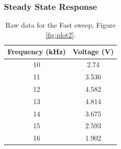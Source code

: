 \documentclass{article}
\begin{document}
\subsubsection{Steady State Response}
\begin{table}[H]
    \centering
    \begin{tabular}{c|c}
        Frequency (kHz) & Voltage (V) \\
        \hline
        10	&	2.74	\\
        11	&	3.536	\\
        12	&	4.582	\\
        13	&	4.814	\\
        14	&	3.675	\\
        15	&	2.593	\\
        16	&	1.902	
    \end{tabular}
    \caption{Raw data for the Fast sweep, Figure \ref{fig:plot2}.}
    \label{fig:t2}
\end{table}
\end{document}
